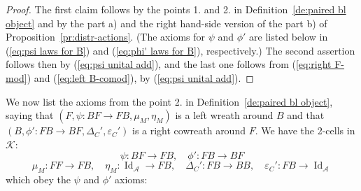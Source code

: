 \documentclass[a4paper, 12pt]{article}
\renewcommand{\_}[1]{\mbox{$_{\left( #1 \right)}$}}
\theoremstyle{plain}
\newcommand{\qed}{\hfill\quad\fbox{\rule[0mm]{0,0cm}{0,0mm}}  \par\bigskip}
\newcommand{\A}{{\mathcal A}}
\newcommand{\Id}{\operatorname {Id}}
\newcommand{\Epsilon}{\varepsilon}
\def\K{{\mathcal K}}  %
\newcommand{\eqlabel}[1]{\label{eq:#1}}
\newcommand{\equref}[1]{(\ref{eq:#1})}
\newcommand{\deref}[1]{Definition~\ref{de:#1}}
\newcommand{\prref}[1]{Proposition~\ref{pr:#1}}
\begin{document}
\begin{proof}
The first claim follows by the points 1. and 2. in \deref{paired bl object} and by the part a) and the right hand-side version of the part b) of \prref{distr-actions}. 
(The axioms for $\psi$ and $\phi'$ are listed below in \equref{psi laws for B} and \equref{phi' laws for B}, respectively.) The second assertion follows then by \equref{psi unital add}, 
and the last one follows from \equref{right F-mod} and \equref{left B-comod}, by \equref{psi unital add}. 
\qed\end{proof}


We now list the axioms from the point 2. in \deref{paired bl object}, saying that $(F, \psi: BF\to FB, \mu_M, \eta_M)$ is a left wreath around $B$ and that 
$(B, \phi': FB\to BF, \Delta_C', \Epsilon_C')$ is a right cowreath around $F$. We have the 2-cells in $\K$:
$$\psi: BF\to FB, \quad \phi': FB\to BF$$
$$\mu_M:FF\to FB, \quad \eta_M:\Id_{\A}\to FB, \quad \Delta_C': FB\to BB, \quad \Epsilon_C': FB\to\Id_{\A}$$
which obey the $\psi$ and $\phi'$ axioms:
\end{document}
